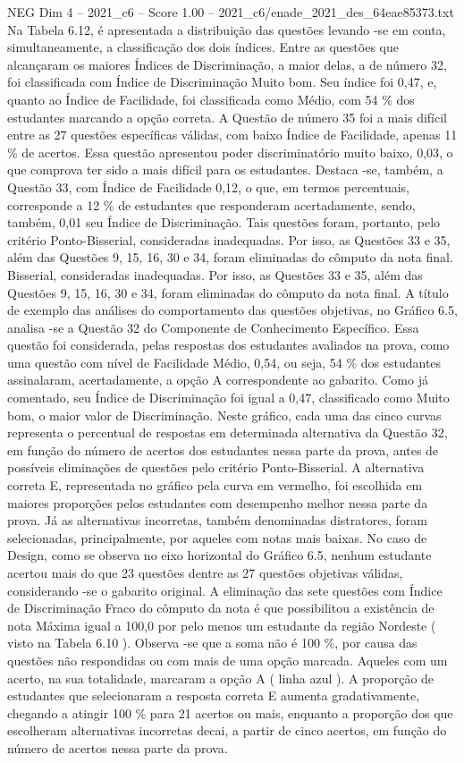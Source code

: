 \begin{textsample}{NEG Dim 4 – 2021\_c6 – Score 1.00 – 2021\_c6/enade\_2021\_des\_64eae85373.txt}
Na Tabela 6.12, é apresentada a distribuição das questões levando -se em conta, simultaneamente, a classificação dos dois índices.
Entre as questões que alcançaram os maiores Índices de Discriminação, a maior delas, a de número 32, foi classificada com Índice de Discriminação Muito bom.
Seu índice foi 0,47, e, quanto ao Índice de Facilidade, foi classificada como Médio, com 54 \% dos estudantes marcando a opção correta.
A Questão de número 35 foi a mais difícil entre as 27 questões específicas válidas, com baixo Índice de Facilidade, apenas 11 \% de acertos.
Essa questão apresentou poder discriminatório muito baixo, 0,03, o que comprova ter sido a mais difícil para os estudantes.
Destaca -se, também, a Questão 33, com Índice de Facilidade 0,12, o que, em termos percentuais, corresponde a 12 \% de estudantes que responderam acertadamente, sendo, também, 0,01 seu Índice de Discriminação.
Tais questões foram, portanto, pelo critério Ponto-Bisserial, consideradas inadequadas.
Por isso, as Questões 33 e 35, além das Questões 9, 15, 16, 30 e 34, foram eliminadas do cômputo da nota final.
Bisserial, consideradas inadequadas.
Por isso, as Questões 33 e 35, além das Questões 9, 15, 16, 30 e 34, foram eliminadas do cômputo da nota final.
A título de exemplo das análises do comportamento das questões objetivas, no Gráfico 6.5, analisa -se a Questão 32 do Componente de Conhecimento Específico.
Essa questão foi considerada, pelas respostas dos estudantes avaliados na prova, como uma questão com nível de Facilidade Médio, 0,54, ou seja, 54 \% dos estudantes assinalaram, acertadamente, a opção A correspondente ao gabarito.
Como já comentado, seu Índice de Discriminação foi igual a 0,47, classificado como Muito bom, o maior valor de Discriminação.
Neste gráfico, cada uma das cinco curvas representa o percentual de respostas em determinada alternativa da Questão 32, em função do número de acertos dos estudantes nessa parte da prova, antes de possíveis eliminações de questões pelo critério Ponto-Bisserial.
A alternativa correta E, representada no gráfico pela curva em vermelho, foi escolhida em maiores proporções pelos estudantes com desempenho melhor nessa parte da prova.
Já as alternativas incorretas, também denominadas distratores, foram selecionadas, principalmente, por aqueles com notas mais baixas.
No caso de Design, como se observa no eixo horizontal do Gráfico 6.5, nenhum estudante acertou mais do que 23 questões dentre as 27 questões objetivas válidas, considerando -se o gabarito original.
A eliminação das sete questões com Índice de Discriminação Fraco do cômputo da nota é que possibilitou a existência de nota Máxima igual a 100,0 por pelo menos um estudante da região Nordeste ( visto na Tabela 6.10 ).
Observa -se que a soma não é 100 \%, por causa das questões não respondidas ou com mais de uma opção marcada.
Aqueles com um acerto, na sua totalidade, marcaram a opção A ( linha azul ).
A proporção de estudantes que selecionaram a resposta correta E aumenta gradativamente, chegando a atingir 100 \% para 21 acertos ou mais, enquanto a proporção dos que escolheram alternativas incorretas decai, a partir de cinco acertos, em função do número de acertos nessa parte da prova.

\end{textsample}

